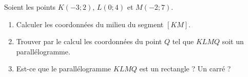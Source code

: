 
\begin{exercice}\label{exosmath-0521}

    Soient les points \( K(-3;2)\), \( L(0;4)\) et \( M(-2;7)\).
    \begin{enumerate}
        \item
            Calculer les coordonnées du milieu du segment \( [KM]\).
        \item
            Trouver par le calcul les coordonnées du point \( Q\) tel que \( KLMQ\) soit un parallélogramme.
        \item
            Est-ce que le parallélogramme \( KLMQ\) est un rectangle ? Un carré ?
    \end{enumerate}

\end{exercice}
